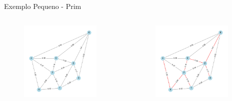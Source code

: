 \documentclass[aspectratio=169,usenames,dvipsnames]{beamer}
\begin{document}
\begin{frame}{Exemplo Pequeno - Prim}
    \begin{columns}
    \begin{figure}[ht]
    \centering
        \includegraphics[width=0.9\textwidth]{figs/exemplo_0.pdf}
    \end{figure}
        \begin{figure}[ht]
        \centering
            \includegraphics[width=0.9\textwidth]{figs/exemplo_0_prim.pdf}

        \end{figure}
    \end{columns}
\end{frame}
\end{document}
